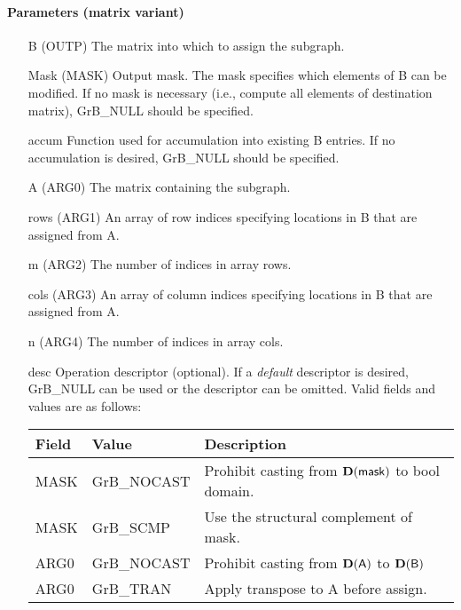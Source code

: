 \paragraph{Parameters (matrix variant)}

\begin{itemize}[leftmargin=1.1in]
    \item[{\sf B}]   ({\sf OUTP}) The matrix into which to assign the subgraph.
    \item[{\sf Mask}] ({\sf MASK}) Output mask. The mask specifies which elements
    of {\sf B} can be modified. If no mask is necessary (i.e., compute all
    elements of destination matrix), {\sf GrB\_NULL} should be specified.
    \item[{\sf accum}] Function used for accumulation into existing {\sf B} entries.  If no accumulation
                        is desired, {\sf GrB\_NULL} should be specified.
    \item[{\sf A}]   ({\sf ARG0}) The matrix containing the subgraph.
    \item[{\sf rows}]     ({\sf ARG1}) An array of row indices specifying locations in {\sf B} that
                       are assigned from {\sf A}. 
    \item[{\sf m}]     ({\sf ARG2}) The number of indices in array {\sf rows}.
    \item[{\sf cols}]     ({\sf ARG3}) An array of column indices 
                       specifying locations in {\sf B} that are assigned from {\sf A}.
    \item[{\sf n}]	({\sf ARG4}) The number of indices in array {\sf cols}.
    \item[{\sf desc}]   Operation descriptor (optional). If a
    \emph{default} descriptor is desired, {\sf GrB\_NULL} can be
    used or the descriptor can be omitted.  Valid fields and values are as follows: \\
    \begin{tabular}{lll}
    Field  & Value & Description \\
    \hline
    {\sf MASK} & {\sf GrB\_NOCAST} & Prohibit casting from $\bold{D}({\sf mask})$ to {\sf bool} domain. \\
    {\sf MASK} & {\sf GrB\_SCMP} & Use the structural complement of {\sf mask}. \\
    {\sf ARG0} & {\sf GrB\_NOCAST} & Prohibit casting from $\bold{D}({\sf A})$ to $\bold{D}({\sf B})$ \\
    {\sf ARG0} & {\sf GrB\_TRAN} & Apply transpose to {\sf A} before assign. \\
    \end{tabular}
\end{itemize}

